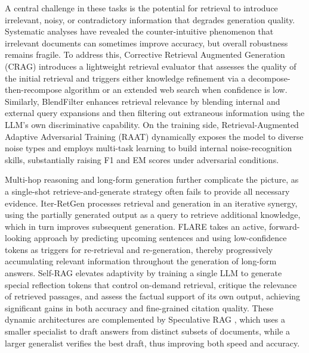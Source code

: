 \documentclass[11pt,a4paper]{article}
\begin{document}
A central challenge in these tasks is the potential for retrieval to introduce irrelevant, noisy, or contradictory information that degrades generation quality. Systematic analyses \cite{arxiv:2401.14887v3} have revealed the counter-intuitive phenomenon that irrelevant documents can sometimes improve accuracy, but overall robustness remains fragile. To address this, Corrective Retrieval Augmented Generation (CRAG) \cite{arxiv:2401.15884v2} introduces a lightweight retrieval evaluator that assesses the quality of the initial retrieval and triggers either knowledge refinement via a decompose-then-recompose algorithm or an extended web search when confidence is low. Similarly, BlendFilter \cite{arxiv:2402.11129v1} enhances retrieval relevance by blending internal and external query expansions and then filtering out extraneous information using the LLM's own discriminative capability. On the training side, Retrieval-Augmented Adaptive Adversarial Training (RAAT) \cite{arxiv:2405.20978v1} dynamically exposes the model to diverse noise types and employs multi-task learning to build internal noise-recognition skills, substantially raising F1 and EM scores under adversarial conditions.

Multi-hop reasoning and long-form generation further complicate the picture, as a single-shot retrieve-and-generate strategy often fails to provide all necessary evidence. Iter-RetGen \cite{arxiv:2305.15294v2} processes retrieval and generation in an iterative synergy, using the partially generated output as a query to retrieve additional knowledge, which in turn improves subsequent generation. FLARE \cite{arxiv:2305.06983v2} takes an active, forward-looking approach by predicting upcoming sentences and using low-confidence tokens as triggers for re-retrieval and re-generation, thereby progressively accumulating relevant information throughout the generation of long-form answers. Self-RAG \cite{arxiv:2310.11511v1} elevates adaptivity by training a single LLM to generate special reflection tokens that control on-demand retrieval, critique the relevance of retrieved passages, and assess the factual support of its own output, achieving significant gains in both accuracy and fine-grained citation quality. These dynamic architectures are complemented by Speculative RAG \cite{arxiv:2407.08223v1}, which uses a smaller specialist to draft answers from distinct subsets of documents, while a larger generalist verifies the best draft, thus improving both speed and accuracy.
\end{document}
